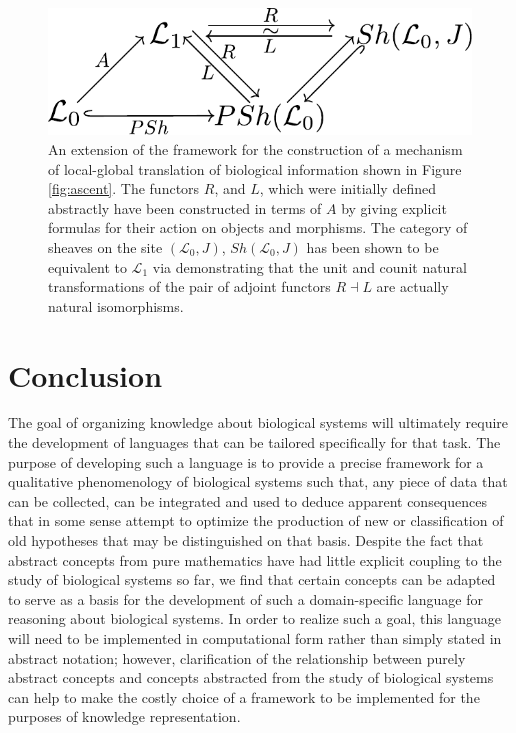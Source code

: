 \documentclass[aps,twocolumn]{revtex4-1}
\begin{document}
\begin{figure}
\noindent\includegraphics[width=0.9\columnwidth]{fig/equivalence.pdf}
\caption{An extension of the framework for the construction of a mechanism of local-global translation of biological information shown in Figure \ref{fig:ascent}.  The functors $R$, and $L$, which were initially defined abstractly have been constructed in terms of $A$ by giving explicit formulas for their action on objects and morphisms. The category of sheaves on the site $(\mathcal{L}_0,J)$, $Sh(\mathcal{L}_0,J)$  has been shown to be equivalent to $\mathcal{L}_1$ via demonstrating that the unit and counit natural transformations of the pair of adjoint functors $R 
\dashv L$ are actually natural isomorphisms.}
\label{fig:equivalence}
\end{figure}
 
\section{Conclusion}

The goal of organizing knowledge about biological systems will ultimately require the development of languages that can be tailored specifically for that task. The purpose of developing such a language is to provide a precise framework for a qualitative phenomenology of biological systems such that, any piece of data that can be collected, can be integrated and used to deduce apparent consequences that in some sense attempt to optimize the production of new or classification of old hypotheses that may be distinguished on that basis. Despite the fact that abstract concepts from pure mathematics have had little explicit coupling to the study of biological systems so far, we find that certain concepts can be adapted to serve as a basis for the development of such a domain-specific language for reasoning about biological systems. In order to realize such a goal, this language will need to be implemented in computational form rather than simply stated in abstract notation; however, clarification of the relationship between purely abstract concepts and concepts abstracted from the study of biological systems can help to make the costly choice of a framework to be implemented for the purposes of knowledge representation.
\end{document}
